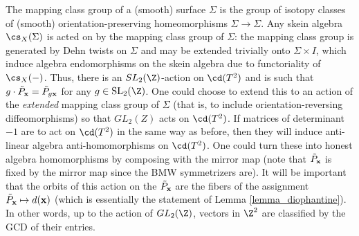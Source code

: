 \begin{remark}\label{remark_gl2z}
The mapping class group of a (smooth) surface $\Sigma$ is the group of isotopy classes of (smooth) orientation-preserving homeomorphisms $\Sigma \to \Sigma$. Any skein algebra $\cs_X(\Sigma)$ is acted on by the mapping class group of $\Sigma$: the mapping class group is generated by Dehn twists on $\Sigma$ and may be extended trivially onto $\Sigma \times I$, which induce algebra endomorphisms on the skein algebra due to functoriality of $\cs_X(-)$. Thus, there is an $SL_2(\Z)$-action on $\cd(T^2)$ and is such that $g \cdot \tilde{P}_{\mathbf{x}} = \tilde{P}_{g{\mathbf{x}}}$ for any $g \in \SL_2(\Z)$. One could choose to extend this to an action of the \textit{extended} mapping class group of $\Sigma$ (that is, to include orientation-reversing diffeomorphisms) so that $GL_2(Z)$ acts on $\cd(T^2)$. If matrices of determinant $-1$ are to act on $\cd(T^2)$ in the same way as before, then they will induce anti-linear algebra anti-homomorphisms on $\cd(T^2)$. One could turn these into honest algebra homomorphisms by composing with the mirror map (note that $\tilde{P}_{\mathbf{x}}$ is fixed by the mirror map since the BMW symmetrizers are). It will be important that the orbits of this action on the $\tilde{P}_{{\mathbf{x}}}$ are the fibers of the assignment $\tilde{P}_{{\mathbf{x}}} \mapsto d({\mathbf{x}})$ (which is essentially the statement of Lemma \ref{lemma_diophantine}). In other words, up to the action of $GL_2(\Z)$, vectors in $\Z^2$ are classified by the GCD of their entries.
\end{remark}


